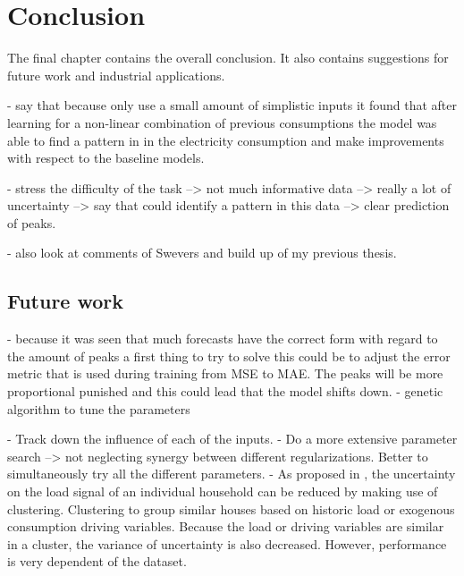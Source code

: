 \chapter{Conclusion}
\label{cha:conclusion}
The final chapter contains the overall conclusion. It also contains
suggestions for future work and industrial applications.

- say that because only use a small amount of simplistic inputs it found that after learning for a non-linear combination of previous consumptions the model was able to find a pattern in in the electricity consumption and make improvements with respect to the baseline models.

- stress the difficulty of the task --> not much informative data --> really a lot of uncertainty --> say that could identify a pattern in this data --> clear prediction of peaks.

- also look at comments of Swevers and build up of my previous thesis.

\section{Future work}
- because it was seen that much forecasts have the correct form with regard to the amount of peaks a first thing to try to solve this could be to adjust the error metric that is used during training from MSE to MAE. The peaks will be more proportional punished and this could lead that the model shifts down. 
- genetic algorithm to tune the parameters

- Track down the influence of each of the inputs.
- Do a more extensive parameter search --> not neglecting synergy between different regularizations. Better to simultaneously try all the different parameters.
- As proposed in \cite{Shi2018}, the uncertainty on the load signal of an individual household can be reduced by making use of clustering.  Clustering to group similar houses based on historic load or exogenous consumption driving variables. Because the load or driving variables are similar in a cluster, the variance of uncertainty is also decreased. However, performance is very dependent of the dataset.

